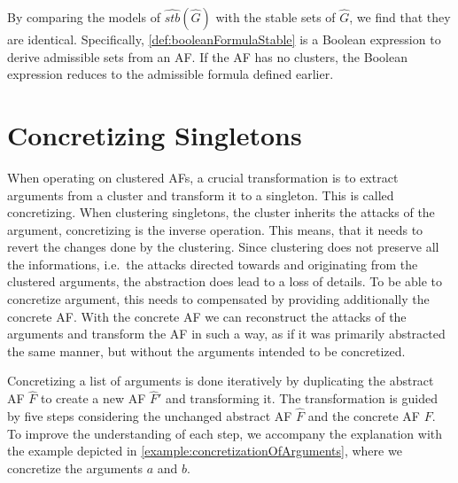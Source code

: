 By comparing the models of $\hat{stb}(\hat{G})$ with the stable sets of $\hat{G}$, we find that they are identical. Specifically, \cref{def:booleanFormulaStable} is a Boolean expression to derive admissible sets from an AF. If the AF has no clusters, the Boolean expression reduces to the admissible formula defined earlier.


\section{Concretizing Singletons}
\label{sec:ConcretizingSingletons}
When operating on clustered AFs, a crucial transformation is to extract arguments from a cluster and transform it to a singleton. This is called concretizing. When clustering singletons, the cluster inherits the attacks of the argument, concretizing is the inverse operation. This means, that it needs to revert the changes done by the clustering. Since clustering does not preserve all the informations, i.e.\ the attacks directed towards and originating from the clustered arguments, the abstraction does lead to a loss of details. To be able to concretize argument, this needs to compensated by providing additionally the concrete AF. With the concrete AF we can reconstruct the attacks of the arguments and transform the AF in such a way, as if it was primarily abstracted the same manner, but without the arguments intended to be concretized.

Concretizing a list of arguments is done iteratively by duplicating the abstract AF $\hat{F}$ to create a new AF $\hat{F}'$ and transforming it. The transformation is guided by five steps considering the unchanged abstract AF $\hat{F}$ and the concrete AF $F$. To improve the understanding of each step, we accompany the explanation with the example depicted in \cref{example:concretizationOfArguments}, where we concretize the arguments $a$ and $b$.


